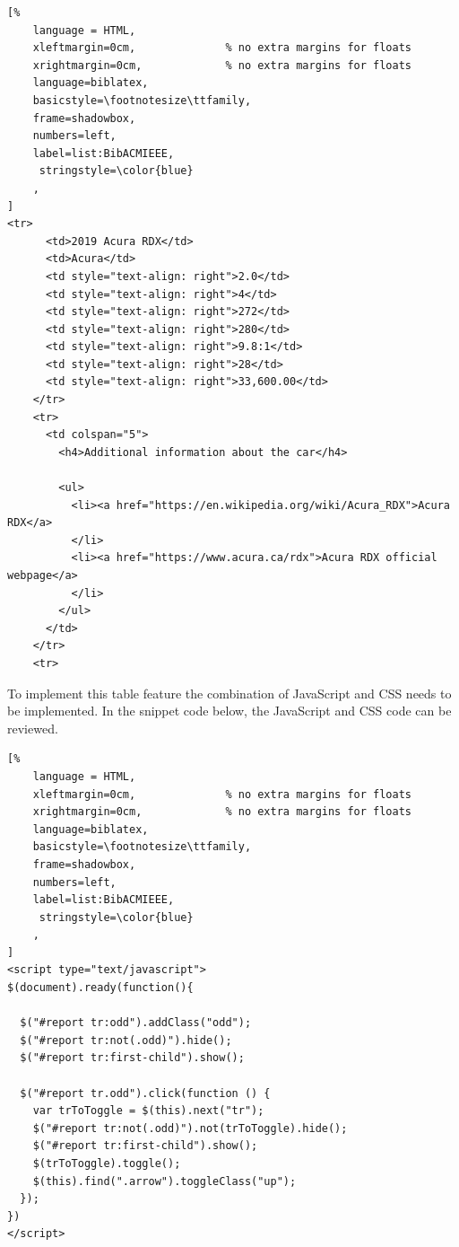 \begin{lstlisting}[%
    language = HTML,
    xleftmargin=0cm,              % no extra margins for floats
    xrightmargin=0cm,             % no extra margins for floats
    language=biblatex,
    basicstyle=\footnotesize\ttfamily,
    frame=shadowbox,
    numbers=left,
    label=list:BibACMIEEE,
     stringstyle=\color{blue}
    ,
]
<tr>
      <td>2019 Acura RDX</td>
      <td>Acura</td>
      <td style="text-align: right">2.0</td>
      <td style="text-align: right">4</td>
      <td style="text-align: right">272</td>
      <td style="text-align: right">280</td>
      <td style="text-align: right">9.8:1</td>
      <td style="text-align: right">28</td>
      <td style="text-align: right">33,600.00</td>
    </tr>
    <tr>
      <td colspan="5">
        <h4>Additional information about the car</h4>

        <ul>
          <li><a href="https://en.wikipedia.org/wiki/Acura_RDX">Acura RDX</a>
          </li>
          <li><a href="https://www.acura.ca/rdx">Acura RDX official webpage</a>
          </li>
        </ul>
      </td>
    </tr>
    <tr>
\end{lstlisting}
To implement this table feature the combination of JavaScript and
CSS needs to be implemented. In the snippet code below, the JavaScript and CSS code can be reviewed.

\begin{lstlisting}[%
    language = HTML,
    xleftmargin=0cm,              % no extra margins for floats
    xrightmargin=0cm,             % no extra margins for floats
    language=biblatex,
    basicstyle=\footnotesize\ttfamily,
    frame=shadowbox,
    numbers=left,
    label=list:BibACMIEEE,
     stringstyle=\color{blue}
    ,
]
<script type="text/javascript">
$(document).ready(function(){

  $("#report tr:odd").addClass("odd");
  $("#report tr:not(.odd)").hide();
  $("#report tr:first-child").show();

  $("#report tr.odd").click(function () {
    var trToToggle = $(this).next("tr");
    $("#report tr:not(.odd)").not(trToToggle).hide();
    $("#report tr:first-child").show();
    $(trToToggle).toggle();
    $(this).find(".arrow").toggleClass("up");
  });
})
</script>

\end{lstlisting}
\newpage

